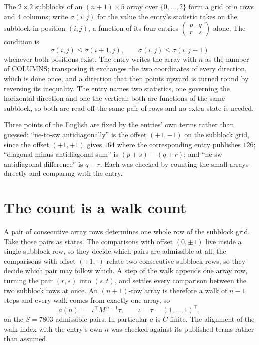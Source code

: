 \documentclass[11pt,a4paper]{article}
\theoremstyle{plain}
\theoremstyle{definition}
\begin{document}
The $2\times2$ subblocks of an $(n+1)\times5$ array over $\{0,\dots,2\}$ form a grid
of $n$ rows and $4$ columns; write $\sigma(i,j)$ for the value the entry's statistic takes on
the subblock in position $(i,j)$, a function of its four entries
$\begin{pmatrix}p&q\\r&s\end{pmatrix}$ alone. The condition is
\[
\sigma(i,j)\le\sigma(i+1,j),\qquad \sigma(i,j)\le\sigma(i,j+1)
\]
whenever both positions exist. The entry writes the array with $n$ as the number of COLUMNS; transposing it exchanges the two coordinates of every direction, which is done once, and a direction that then points upward is turned round by reversing its inequality. The entry names two statistics, one governing the horizontal direction and one the vertical; both are functions of the same subblock, so both are read off the same pair of rows and no extra state is needed.

Three points of the English are fixed by the entries' own terms rather than guessed:
``ne-to-sw antidiagonally'' is the offset $(+1,-1)$ on the subblock grid, since the offset
$(+1,+1)$ gives $164$ where the corresponding entry publishes $126$; ``diagonal minus
antidiagonal sum'' is $(p+s)-(q+r)$; and ``ne-sw antidiagonal difference'' is $q-r$. Each was
checked by counting the small arrays directly and comparing with the entry.

\section{The count is a walk count}

A pair of consecutive array rows determines one whole row of the subblock grid. Take those
pairs as states. The comparisons with offset $(0,\pm1)$ live inside a single subblock row, so
they decide which pairs are admissible at all; the comparisons with offset $(\pm1,\cdot)$
relate two consecutive subblock rows, so they decide which pair may follow which. A step of the
walk appends one array row, turning the pair $(r,s)$ into $(s,t)$, and settles every comparison
between the two subblock rows at once. An $(n+1)$-row array is therefore a walk of $n-1$ steps
and every walk comes from exactly one array, so
\[
a(n)\;=\;\iota^{\!\top}M^{\,n-1}\tau,\qquad \iota=\tau=(1,\dots,1)^{\!\top},
\]
on the $S=7803$ admissible pairs. In particular $a$ is $C$-finite. The alignment of the walk
index with the entry's own $n$ was checked against its published terms rather than assumed.
\end{document}
